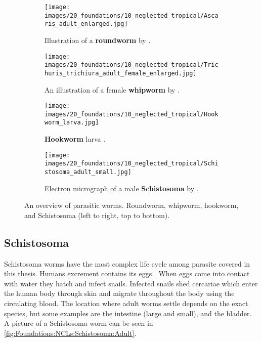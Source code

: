 \begin{figure}
    \begin{subfigure}[t]{0.45\textwidth}
        \centering
        \texttt{[image: images/20\_foundations/10\_neglected\_tropical/Ascaris\_adult\_enlarged.jpg]}
        \caption{Illustration of a \textbf{roundworm} by \textcite{blainville1824traite}.}
        \label{fig:Foundations:NCLs:STHs:Ascaris}
        \vspace*{2mm}
    \end{subfigure}
    \hfill
    \begin{subfigure}[t]{0.45\textwidth}
        \centering
        \texttt{[image: images/20\_foundations/10\_neglected\_tropical/Trichuris\_trichiura\_adult\_female\_enlarged.jpg]}
        \caption{An illustration of a female \textbf{whipworm} by \textcite{blainville1824traite}.}
        \label{fig:Foundations:NCLs:STHs:Whipworm:Adult}
        \vspace*{2mm}
    \end{subfigure}
    \begin{subfigure}[t]{0.45\textwidth}
        \centering
        \texttt{[image: images/20\_foundations/10\_neglected\_tropical/Hookworm\_larva.jpg]}
        \caption{\textbf{Hookworm} larva \cite{dpdx2019hookworm}.}
        \label{fig:Foundations:NCLs:STHs:Hookworm:Adult}
    \end{subfigure}    
    \hfill
    \begin{subfigure}[t]{0.45\textwidth}
        \centering
        \texttt{[image: images/20\_foundations/10\_neglected\_tropical/Schistosoma\_adult\_small.jpg]}
        \caption{Electron micrograph of a male \textbf{Schistosoma} by \textcite{davidwilliams2009schistosoma}.}
        \label{fig:Foundations:NCLs:Schistosoma:Adult}
    \end{subfigure}
    \caption{An overview of parasitic worms. Roundworm, whipworm, hookworm, and Schistosoma (left to right, top to bottom).}
    \label{fig:Foundations:NCLs:Overview}
\end{figure}


\subsection{Schistosoma}
\label{sec:Foundations:NTDs:STHs:Schistosoma}

Schistosoma worms have the most complex life cycle among parasite covered in this thesis. Humans excrement contains its eggs \cite{nelwan2019schistosomiasis}. When eggs come into contact with water they hatch and infect snails. Infected snails shed cercariae which enter the human body through skin and migrate throughout the body using the circulating blood. The location where adult worms settle depends on the exact species, but some examples are the intestine (large and small), and the bladder. A picture of a Schistosoma worm can be seen in \autoref{fig:Foundations:NCLs:Schistosoma:Adult}.

